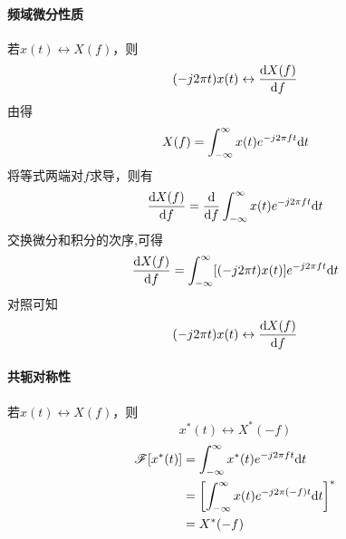     \paragraph{频域微分性质}
        若$x(t)\leftrightarrow X(f)$，则
        \begin{equation}
            (-j2\pi t)x(t) \leftrightarrow \frac{\text{\upshape d} X(f)}{\text{\upshape d} f}
        \end{equation}
        \Proof 由得
        \begin{equation*}
            X(f) =\int_{-\infty}^{\infty}x(t)e^{-j2\pi ft}\text{\upshape d} t
        \end{equation*}
        将等式两端对$f$求导，则有
        \begin{equation*}
            \frac{\text{\upshape d} X(f)}{\text{\upshape d} f} =\frac{\text{\upshape d}}{\text{\upshape d} f}\int_{-\infty}^{\infty}x(t)e^{-j2\pi ft}\text{\upshape d} t
        \end{equation*}
        交换微分和积分的次序,可得
        \begin{equation*}
            \frac{\text{\upshape d} X(f)}{\text{\upshape d} f} =\int_{-\infty}^{\infty}[(-j2\pi t)x(t)]e^{-j2\pi ft}\text{\upshape d} t
        \end{equation*}
        对照可知
        \begin{equation*}
            (-j2\pi t)x(t) \leftrightarrow \frac{\text{\upshape d} X(f)}{\text{\upshape d} f}
        \end{equation*}
    
    \paragraph{共轭对称性}
        若$x(t)\leftrightarrow X(f)$，则
        \begin{equation}
            x^*(t)\leftrightarrow X^*(-f)
        \end{equation}
        \Proof 
        \begin{equation*}
            \begin{split}
                \mathscr{F}[x^*(t)] &= \int_{-\infty}^{\infty}x^*(t)e^{-j2\pi ft}\text{\upshape d} t\\
                                    &= \left[\int_{-\infty}^{\infty}x(t)e^{-j2\pi (-f)t}\text{\upshape d} t\right]^*\\
                                    &= X^*(-f)
            \end{split}
        \end{equation*}

